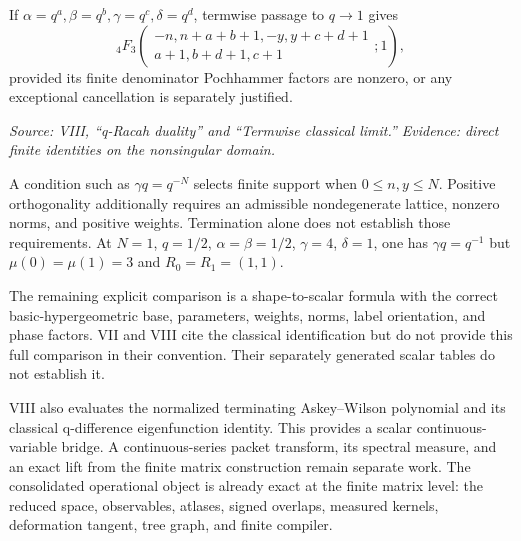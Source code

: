 If $\alpha=q^a,\beta=q^b,\gamma=q^c,\delta=q^d$, termwise passage to $q\to1$ gives
\[
{}_4F_3\!\left(
\begin{matrix}-n,n+a+b+1,-y,y+c+d+1\\a+1,b+d+1,c+1\end{matrix};1\right),
\]
provided its finite denominator Pochhammer factors are nonzero, or any exceptional cancellation is separately justified.

\noindent\emph{Source: VIII, ``q-Racah duality'' and ``Termwise classical limit.'' Evidence: direct finite identities on the nonsingular domain.}

A condition such as $\gamma q=q^{-N}$ selects finite support when $0\leq n,y\leq N$. Positive orthogonality additionally requires an admissible nondegenerate lattice, nonzero norms, and positive weights. Termination alone does not establish those requirements. At $N=1$, $q=1/2$, $\alpha=\beta=1/2$, $\gamma=4$, $\delta=1$, one has $\gamma q=q^{-1}$ but $\mu(0)=\mu(1)=3$ and $R_0=R_1=(1,1)$.

The remaining explicit comparison is a shape-to-scalar formula with the correct basic-hypergeometric base, parameters, weights, norms, label orientation, and phase factors. VII and VIII cite the classical identification but do not provide this full comparison in their convention. Their separately generated scalar tables do not establish it.

VIII also evaluates the normalized terminating Askey--Wilson polynomial and its classical q-difference eigenfunction identity. This provides a scalar continuous-variable bridge. A continuous-series packet transform, its spectral measure, and an exact lift from the finite matrix construction remain separate work. The consolidated operational object is already exact at the finite matrix level: the reduced space, observables, atlases, signed overlaps, measured kernels, deformation tangent, tree graph, and finite compiler.
